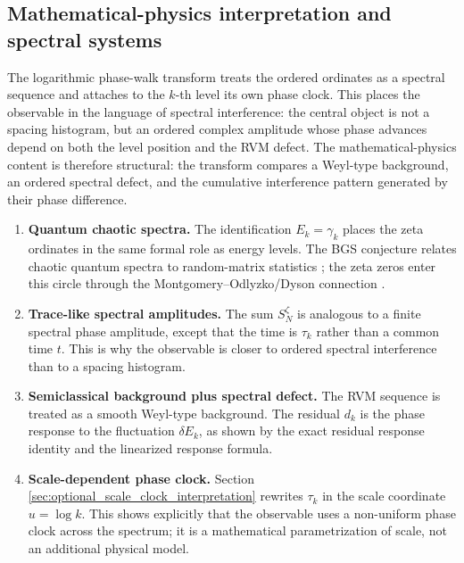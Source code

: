 \documentclass[12pt]{article}
\numberwithin{equation}{section}
\begin{document}
\subsection{Mathematical-physics interpretation and spectral systems}
\label{sec:physical_systems}


\noindent The logarithmic phase-walk transform treats the ordered ordinates as a spectral sequence and attaches to the \(k\)-th level its own phase clock.  This places the observable in the language of spectral interference: the central object is not a spacing histogram, but an ordered complex amplitude whose phase advances depend on both the level position and the RVM defect.  The mathematical-physics content is therefore structural: the transform compares a Weyl-type background, an ordered spectral defect, and the cumulative interference pattern generated by their phase difference.


\begin{enumerate}[label=\textup{(\roman*)}]
\item \textbf{Quantum chaotic spectra.}  The identification \(E_k=\gamma_k\) places the zeta ordinates in the same formal role as energy levels.  The BGS conjecture relates chaotic quantum spectra to random-matrix statistics \cite{BohigasGiannoniSchmit1984}; the zeta zeros enter this circle through the Montgomery--Odlyzko/Dyson connection \cite{Montgomery1973,Odlyzko1987,ConreySnaith2008}.

\item \textbf{Trace-like spectral amplitudes.}  The sum \(S_N^\zeta\) is analogous to a finite spectral phase amplitude, except that the time is \(\tau_k\) rather than a common time \(t\).  This is why the observable is closer to ordered spectral interference than to a spacing histogram.

\item \textbf{Semiclassical background plus spectral defect.}  The RVM sequence is treated as a smooth Weyl-type background.  The residual \(d_k\) is the phase response to the fluctuation \(\delta E_k\), as shown by the exact residual response identity and the linearized response formula.

\item \textbf{Scale-dependent phase clock.}  Section \ref{sec:optional_scale_clock_interpretation} rewrites \(\tau_k\) in the scale coordinate \(u=\log k\).  This shows explicitly that the observable uses a non-uniform phase clock across the spectrum; it is a mathematical parametrization of scale, not an additional physical model.
\end{enumerate}
\end{document}
